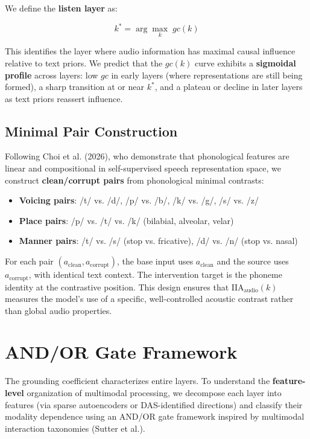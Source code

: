 \documentclass[a4paper]{article}
\begin{document}
We define the \textbf{listen layer} as:

\[k^* = \arg\max_k \; gc(k)\]

This identifies the layer where audio information has maximal causal influence relative to text priors. We predict that the $gc(k)$ curve exhibits a \textbf{sigmoidal profile} across layers: low $gc$ in early layers (where representations are still being formed), a sharp transition at or near $k^*$, and a plateau or decline in later layers as text priors reassert influence.

\subsection{Minimal Pair Construction}

Following Choi et al. (2026), who demonstrate that phonological features are linear and compositional in self-supervised speech representation space, we construct \textbf{clean/corrupt pairs} from phonological minimal contrasts:

\begin{itemize}
\item \textbf{Voicing pairs}: /t/ vs. /d/, /p/ vs. /b/, /k/ vs. /g/, /s/ vs. /z/
\item \textbf{Place pairs}: /p/ vs. /t/ vs. /k/ (bilabial, alveolar, velar)
\item \textbf{Manner pairs}: /t/ vs. /s/ (stop vs. fricative), /d/ vs. /n/ (stop vs. nasal)
\end{itemize}

For each pair $(a_{\text{clean}}, a_{\text{corrupt}})$, the base input uses $a_{\text{clean}}$ and the source uses $a_{\text{corrupt}}$, with identical text context. The intervention target is the phoneme identity at the contrastive position. This design ensures that $\text{IIA}_{\text{audio}}(k)$ measures the model's use of a specific, well-controlled acoustic contrast rather than global audio properties.


\section{AND/OR Gate Framework}

The grounding coefficient characterizes entire layers. To understand the \textbf{feature-level} organization of multimodal processing, we decompose each layer into features (via sparse autoencoders or DAS-identified directions) and classify their modality dependence using an AND/OR gate framework inspired by multimodal interaction taxonomies (Sutter et al.).
\end{document}
